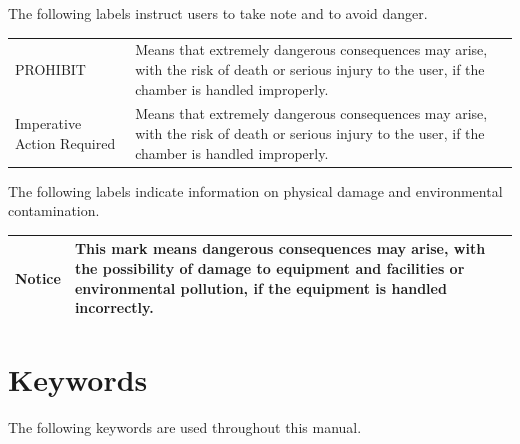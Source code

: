 The following labels instruct users to take note and to avoid danger.

\begin{longtable}[]{@{}ll@{}}
\toprule
\endhead
\begin{minipage}[t]{0.28\columnwidth}\raggedright
PROHIBIT\strut
\end{minipage} & \begin{minipage}[t]{0.66\columnwidth}\raggedright
Means that extremely dangerous consequences may arise, with the risk of
death or serious injury to the user, if the chamber is handled
improperly.\strut
\end{minipage}\tabularnewline
\begin{minipage}[t]{0.28\columnwidth}\raggedright
Imperative Action Required\strut
\end{minipage} & \begin{minipage}[t]{0.66\columnwidth}\raggedright
Means that extremely dangerous consequences may arise, with the risk of
death or serious injury to the user, if the chamber is handled
improperly.\strut
\end{minipage}\tabularnewline
\bottomrule
\end{longtable}

The following labels indicate information on physical damage and
environmental contamination.

\begin{longtable}[]{@{}ll@{}}
\toprule
\endhead
\begin{minipage}[t]{0.28\columnwidth}\raggedright
Notice\strut
\end{minipage} & \begin{minipage}[t]{0.66\columnwidth}\raggedright
This mark means dangerous consequences may arise, with the possibility
of damage to equipment and facilities or environmental pollution, if the
equipment is handled incorrectly.\strut
\end{minipage}\tabularnewline
\bottomrule
\end{longtable}


\section{Keywords}

The following keywords are used throughout this manual.

